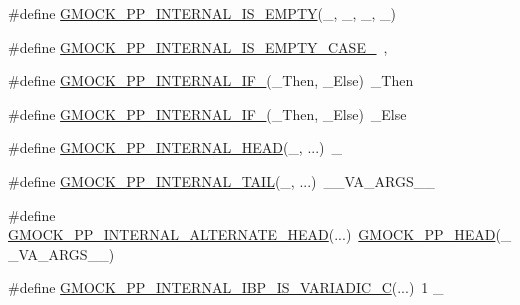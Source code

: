 \begin{DoxyCompactItemize}
\item 
\#define \mbox{\hyperlink{_obj__test_2lib_2googletest-master_2googlemock_2include_2gmock_2internal_2gmock-pp_8h_a7ed13884d5ca70a35102f76d65677b13}{G\+M\+O\+C\+K\+\_\+\+P\+P\+\_\+\+I\+N\+T\+E\+R\+N\+A\+L\+\_\+\+I\+S\+\_\+\+E\+M\+P\+TY}}(\+\_,  \+\_,  \+\_,  \+\_)
\item 
\#define \mbox{\hyperlink{_obj__test_2lib_2googletest-master_2googlemock_2include_2gmock_2internal_2gmock-pp_8h_ad02fd031aeb323ae431ebdfda4acdc99}{G\+M\+O\+C\+K\+\_\+\+P\+P\+\_\+\+I\+N\+T\+E\+R\+N\+A\+L\+\_\+\+I\+S\+\_\+\+E\+M\+P\+T\+Y\+\_\+\+C\+A\+S\+E\+\_}}~,
\item 
\#define \mbox{\hyperlink{_obj__test_2lib_2googletest-master_2googlemock_2include_2gmock_2internal_2gmock-pp_8h_a9983cbccb2cbb6892e983b28ac9e2077}{G\+M\+O\+C\+K\+\_\+\+P\+P\+\_\+\+I\+N\+T\+E\+R\+N\+A\+L\+\_\+\+I\+F\+\_}}(\+\_\+\+Then,  \+\_\+\+Else)~\+\_\+\+Then
\item 
\#define \mbox{\hyperlink{_obj__test_2lib_2googletest-master_2googlemock_2include_2gmock_2internal_2gmock-pp_8h_afa9219c0158e29914036bfe9959ed0d7}{G\+M\+O\+C\+K\+\_\+\+P\+P\+\_\+\+I\+N\+T\+E\+R\+N\+A\+L\+\_\+\+I\+F\+\_}}(\+\_\+\+Then,  \+\_\+\+Else)~\+\_\+\+Else
\item 
\#define \mbox{\hyperlink{_obj__test_2lib_2googletest-master_2googlemock_2include_2gmock_2internal_2gmock-pp_8h_a76a2c212a600bad8c26c34343785d070}{G\+M\+O\+C\+K\+\_\+\+P\+P\+\_\+\+I\+N\+T\+E\+R\+N\+A\+L\+\_\+\+H\+E\+AD}}(\+\_, ...)~\+\_
\item 
\#define \mbox{\hyperlink{_obj__test_2lib_2googletest-master_2googlemock_2include_2gmock_2internal_2gmock-pp_8h_a0e7741e9333e33780a56a8c5e2079942}{G\+M\+O\+C\+K\+\_\+\+P\+P\+\_\+\+I\+N\+T\+E\+R\+N\+A\+L\+\_\+\+T\+A\+IL}}(\+\_, ...)~\+\_\+\+\_\+\+V\+A\+\_\+\+A\+R\+G\+S\+\_\+\+\_\+
\item 
\#define \mbox{\hyperlink{_obj__test_2lib_2googletest-master_2googlemock_2include_2gmock_2internal_2gmock-pp_8h_a397716c397c91563dfbb9c3b974dc2dc}{G\+M\+O\+C\+K\+\_\+\+P\+P\+\_\+\+I\+N\+T\+E\+R\+N\+A\+L\+\_\+\+A\+L\+T\+E\+R\+N\+A\+T\+E\+\_\+\+H\+E\+AD}}(...)~\mbox{\hyperlink{_obj__test_2lib_2googletest-master_2googlemock_2include_2gmock_2internal_2gmock-pp_8h_ad7910160dfc0fb20b239efcf1f3ddd85}{G\+M\+O\+C\+K\+\_\+\+P\+P\+\_\+\+H\+E\+AD}}(\+\_\+\+\_\+\+V\+A\+\_\+\+A\+R\+G\+S\+\_\+\+\_\+)
\item 
\#define \mbox{\hyperlink{_obj__test_2lib_2googletest-master_2googlemock_2include_2gmock_2internal_2gmock-pp_8h_a5bec02a24e70c087e6dca52f735356ba}{G\+M\+O\+C\+K\+\_\+\+P\+P\+\_\+\+I\+N\+T\+E\+R\+N\+A\+L\+\_\+\+I\+B\+P\+\_\+\+I\+S\+\_\+\+V\+A\+R\+I\+A\+D\+I\+C\+\_\+C}}(...)~1 \+\_\+

\end{DoxyCompactItemize}
